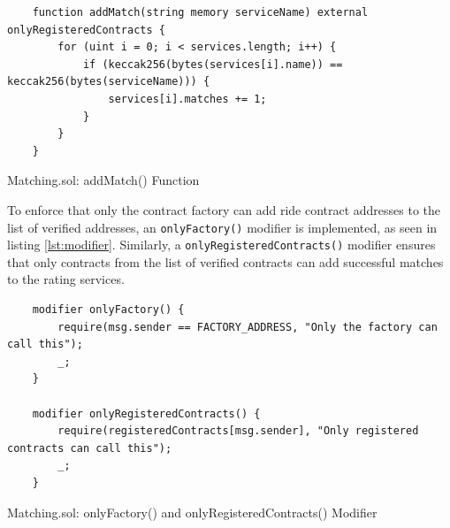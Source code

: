\lstset{
  basicstyle=\footnotesize\ttfamily,
  breaklines=true,
  numbers=left,
  firstnumber=81
}

\begin{Listing}
\begin{lstlisting}
    function addMatch(string memory serviceName) external onlyRegisteredContracts {
        for (uint i = 0; i < services.length; i++) {
            if (keccak256(bytes(services[i].name)) == keccak256(bytes(serviceName))) {
                services[i].matches += 1;
            }
        }
    }
\end{lstlisting}
  \caption{Matching.sol: addMatch() Function}
  \label{lst:addMatch}
\end{Listing}

To enforce that only the contract factory can add ride contract addresses to the list of verified addresses, an \texttt{onlyFactory()} modifier is implemented, as seen in listing \ref{lst:modifier}. Similarly, a \texttt{onlyRegisteredContracts()} modifier ensures that only contracts from the list of verified contracts can add successful matches to the rating services.

\lstset{
  basicstyle=\footnotesize\ttfamily,
  breaklines=true,
  numbers=left,
  firstnumber=24
}

\begin{Listing}
\begin{lstlisting}
    modifier onlyFactory() {
        require(msg.sender == FACTORY_ADDRESS, "Only the factory can call this");
        _;
    }

    modifier onlyRegisteredContracts() {
        require(registeredContracts[msg.sender], "Only registered contracts can call this");
        _;
    }
\end{lstlisting}
  \caption{Matching.sol: onlyFactory() and onlyRegisteredContracts() Modifier}
  \label{lst:modifier}
\end{Listing}







